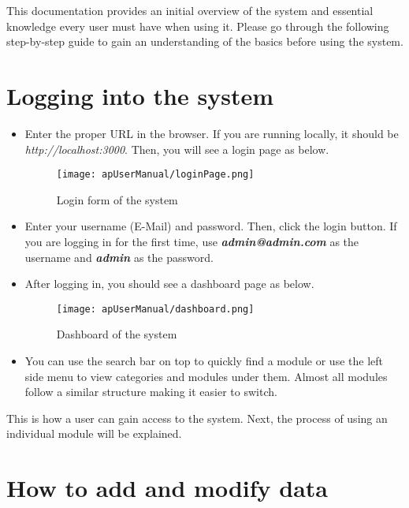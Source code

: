 \documentclass[12pt]{report}
\begin{document}
This documentation provides an initial overview of the system and essential knowledge every user must have when using it. Please go through the following step-by-step guide to gain an understanding of the basics before using the system.

\section{Logging into the system}

\begin{itemize}
	\item Enter the proper URL in the browser. If you are running locally, it should be {\it{http://localhost:3000}}. Then, you will see a login page as below.

	      \begin{figure}[H]
		      \centering
		      \texttt{[image: apUserManual/loginPage.png]}
		      \caption{Login form of the system}
	      \end{figure}

	\item Enter your username (E-Mail) and password. Then, click the login button. If you are logging in for the first time, use {\it\bf{admin@admin.com}} as the username and {\it\bf{admin}} as the password.
	\item After logging in, you should see a dashboard page as below.

	      \begin{figure}[H]
		      \centering
		      \texttt{[image: apUserManual/dashboard.png]}
		      \caption{Dashboard of the system}
	      \end{figure}

	\item You can use the search bar on top to quickly find a module or use the left side menu to view categories and modules under them. Almost all modules follow a similar structure making it easier to switch.

\end{itemize}

This is how a user can gain access to the system. Next, the process of using an individual module will be explained.

\section{How to add and modify data}
\end{document}
